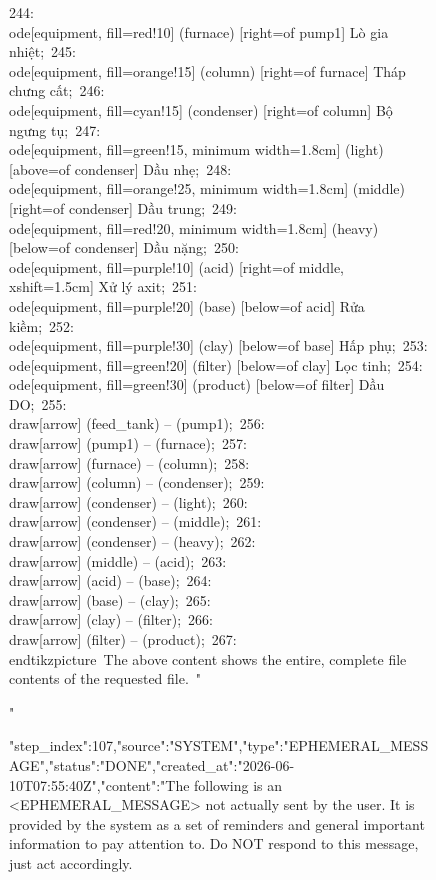 \begin{figure}[htbp]
{{{244: \\
ode[equipment, fill=red!10] (furnace) [right=of pump1] {Lò gia nhiệt};\
245: \\
ode[equipment, fill=orange!15] (column) [right=of furnace] {Tháp chưng cất};\
246: \\
ode[equipment, fill=cyan!15] (condenser) [right=of column] {Bộ ngưng tụ};\
247: \\
ode[equipment, fill=green!15, minimum width=1.8cm] (light) [above=of condenser] {Dầu nhẹ};\
248: \\
ode[equipment, fill=orange!25, minimum width=1.8cm] (middle) [right=of condenser] {Dầu trung};\
249: \\
ode[equipment, fill=red!20, minimum width=1.8cm] (heavy) [below=of condenser] {Dầu nặng};\
250: \\
ode[equipment, fill=purple!10] (acid) [right=of middle, xshift=1.5cm] {Xử lý axit};\
251: \\
ode[equipment, fill=purple!20] (base) [below=of acid] {Rửa kiềm};\
252: \\
ode[equipment, fill=purple!30] (clay) [below=of base] {Hấp phụ};\
253: \\
ode[equipment, fill=green!20] (filter) [below=of clay] {Lọc tinh};\
254: \\
ode[equipment, fill=green!30] (product) [below=of filter] {Dầu DO};\
255: \\draw[arrow] (feed_tank) -- (pump1);\
256: \\draw[arrow] (pump1) -- (furnace);\
257: \\draw[arrow] (furnace) -- (column);\
258: \\draw[arrow] (column) -- (condenser);\
259: \\draw[arrow] (condenser) -- (light);\
260: \\draw[arrow] (condenser) -- (middle);\
261: \\draw[arrow] (condenser) -- (heavy);\
262: \\draw[arrow] (middle) -- (acid);\
263: \\draw[arrow] (acid) -- (base);\
264: \\draw[arrow] (base) -- (clay);\
265: \\draw[arrow] (clay) -- (filter);\
266: \\draw[arrow] (filter) -- (product);\
267: \\end{tikzpicture}\
The above content shows the entire, complete file contents of the requested file.\
"}

"}
{"step_index":107,"source":"SYSTEM","type":"EPHEMERAL_MESSAGE","status":"DONE","created_at":"2026-06-10T07:55:40Z","content":"The following is an <EPHEMERAL_MESSAGE> not actually sent by the user. It is provided by the system as a set of reminders and general important information to pay attention to. Do NOT respond to this message, just act accordingly.

}}
\end{figure}
